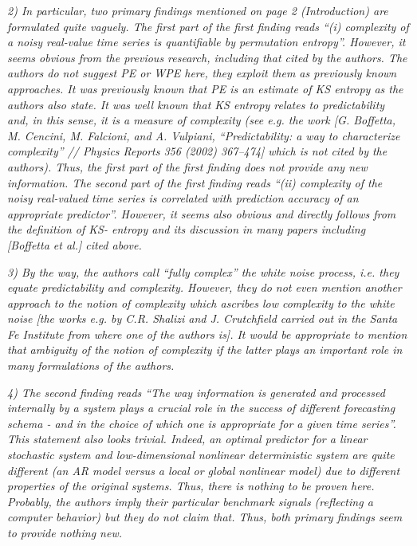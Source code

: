 \documentclass[12pt]{article}
\begin{document}
\emph{2) In particular, two primary findings mentioned on page 2 (Introduction)
are formulated quite vaguely. The first part of the first finding reads ``(i)
complexity of a noisy real-value time series is quantifiable by permutation
entropy''. However, it seems obvious from the previous research, including that
cited by the authors. The authors do not suggest PE or WPE here, they exploit
them as previously known approaches. It was previously known that PE is an
estimate of KS entropy as the authors also state. It was well known that KS
entropy relates to predictability and, in this sense, it is a measure of
complexity (see e.g. the work [G. Boffetta, M. Cencini, M. Falcioni, and A.
Vulpiani, ``Predictability: a way to characterize complexity'' // Physics
Reports 356 (2002) 367–474] which is not cited by the authors). Thus, the first
part of the first finding does not provide any new information. The second part
of the first finding reads ``(ii) complexity of the noisy real-valued time
series is correlated with prediction accuracy of an appropriate predictor''.
However, it seems also obvious and directly follows from the definition of KS-
entropy and its discussion in many papers including [Boffetta et al.] cited
above.}

\emph{3) By the way, the authors call ``fully complex'' the white noise process,
i.e. they equate predictability and complexity. However, they do not even
mention another approach to the notion of complexity which ascribes low
complexity to the white noise [the works e.g. by C.R. Shalizi and J. Crutchfield
carried out in the Santa Fe Institute from where one of the authors is]. It
would be appropriate to mention that ambiguity of the notion of complexity if
the latter plays an important role in many formulations of the authors.}

\emph{4) The second finding reads ``The way information is generated and
processed internally by a system plays a crucial role in the success of
different forecasting schema - and in the choice of which one is appropriate for
a given time series''. This statement also looks trivial. Indeed, an optimal
predictor for a linear stochastic system and low-dimensional nonlinear
deterministic system are quite different (an AR model versus a local or global
nonlinear model) due to different properties of the original systems. Thus,
there is nothing to be proven here. Probably, the authors imply their particular
benchmark signals (reflecting a computer behavior) but they do not claim that.
Thus, both primary findings seem to provide nothing new.}
\end{document}
